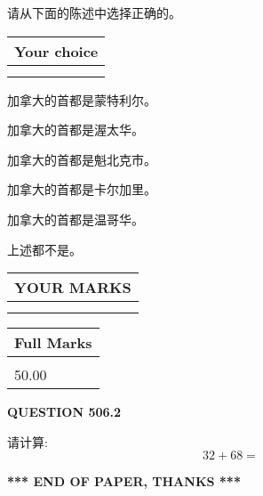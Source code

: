 \documentclass{ctexart}
\begin{document}
  
请从下面的陈述中选择正确的。
  
  
\noindent\hspace{3.0in} \begin{tabular}{|l|}
\hline
Your choice \\
\hline
 \\ 
 \\ 
\hline
\end{tabular}
  
  
 
 
加拿大的首都是蒙特利尔。
 
 
加拿大的首都是渥太华。
 
 
加拿大的首都是魁北克市。
 
 
加拿大的首都是卡尔加里。
 
 
加拿大的首都是温哥华。
 
 
 上述都不是。
 
 
  
\vspace{0.2in}
  
\noindent\begin{tabular}{|l|}
\hline
 YOUR MARKS  \\
\hline
 \\ 
 \\ 
\hline
\end{tabular}
\hspace{0.05in} \begin{tabular}{|l|}
\hline
 Full Marks  \\
\hline
 \\ 
50.00 \\
\hline
\end{tabular}
{\textbf{\Large{QUESTION
506.2 
}}}
  
  
 
请计算:
\begin{equation}
32 +  %
68 = \nonumber
\end{equation}
 

 

 
   
   
 \vspace{0.2in}
 
   
   
   
   
\vspace{1.0in} 
{\textbf{\large{ *** END OF PAPER, THANKS *** }}} 
   
\end{document}
